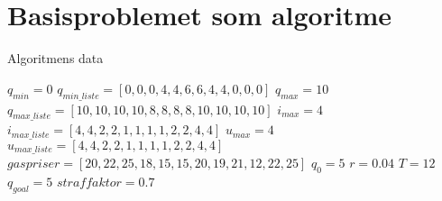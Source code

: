 \section{Basisproblemet som algoritme}
\begin{algorithm}[H] 
\caption{Algoritmens data}
\begin{algorithmic}[1]
\State $q_{min}=0$
\State $q_{min\_liste}=[0,0,0,4,4,6,6,4,4,0,0,0]$
\State $q_{max}=10$
\State $q_{max\_liste}=[10,10,10,10,8,8,8,8,10,10,10,10]$
\State $i_{max}=4$
\State $i_{max\_liste}=[4,4,2,2,1,1,1,1,2,2,4,4]$
\State $u_{max}=4$
\State $u_{max\_liste}=[4,4,2,2,1,1,1,1,2,2,4,4]$
\State $gaspriser=[20,22,25,18,15,15,20,19,21,12,22,25]$
\State $q_{0}=5$
\State $r=0.04$
\State $T=12$
\State $q_{goal}=5$
\State $straffaktor=0.7$

\end{algorithmic}
\label{alg:lineaer}
\end{algorithm}